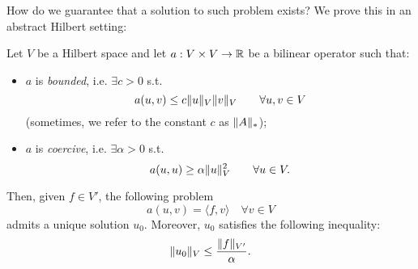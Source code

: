 How do we guarantee that a solution to such problem exists? We prove this in an abstract Hilbert setting:
\begin{lemma}\label{lemma:lax-milgram}
Let $V$ be a Hilbert space and let $a: V\times V \to \mathbb{R}$ be a bilinear operator such that:
\begin{itemize}
\item $a$ is \emph{bounded}, i.e. $\exists c>0$ s.t. 
\[
 a(u,v) \le c \lVert u\rVert_V \lVert v\rVert_V \qquad \forall u,v \in V
 \] 
 (sometimes, we refer to the constant $c$ as $\lVert A\rVert_*$);
\item $a$ is \emph{coercive}, i.e. $\exists \alpha >0$ s.t. 
\[
  a(u,u) \ge \alpha \lVert u\rVert_V^2 \qquad \forall u \in V.
\]
\end{itemize}
Then, given $f\in V'$, the following problem
\begin{equation}\label{eqn:weak_laxmilgram}
a(u,v) = \langle f,v \rangle \quad \forall v\in V
\end{equation}
admits a unique solution $u_0$. Moreover, $u_0$ satisfies the following inequality:
\[
\lVert u_0\rVert_V \le \frac{\lVert f\rVert_{V'}}{\alpha}.
\]
\end{lemma}
